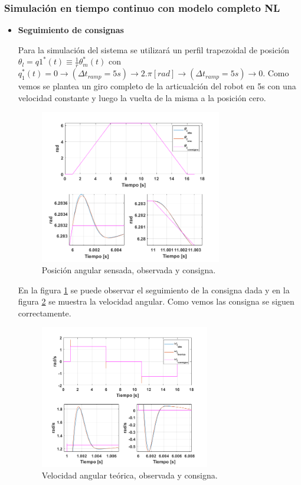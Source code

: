 \documentclass[10pt]{article}
\begin{document}
\subsubsection{Simulación en tiempo continuo con modelo completo NL}
\begin{itemize}
	\item \textbf{Seguimiento de consignas}

Para la simulación del sistema se utilizará un perfil trapezoidal 
de posición 
$\theta_{l}=q1^{*}(t) \equiv \frac{1}{r}\theta^{*}_{m}(t)$ con $q_{1}^{*}(t)=0 \rightarrow (\Delta t_{ramp}=5s) \rightarrow 2.\pi [rad] \rightarrow (\Delta t_{ramp}=5s) \rightarrow 0$. Como vemos se plantea un giro completo de la articualción del robot en 5s
 con una velocidad constante y luego la vuelta de la misma a la posición cero.
 \begin{figure}[h!]
	\centering
	\includegraphics[width=0.75\textwidth]{consigna.png}
	\caption{\label{fig:consigna}Posición angular sensada, observada y consigna.}
	\end{figure}

En la figura \ref{fig:consigna} se puede observar el seguimiento de la consigna dada y en la figura \ref{fig:consigna2} se muestra la velocidad angular. Como vemos las consigna se siguen correctamente.
\begin{figure}[h!]
		\centering
		\includegraphics[width=0.7\textwidth]{consigna2.png}
		\caption{\label{fig:consigna2}Velocidad angular teórica, observada y consigna.}
		\end{figure}


\end{itemize}
\end{document}
